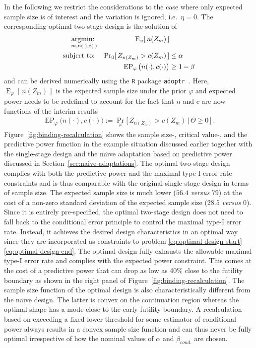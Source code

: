 \documentclass[12pt]{article}
\renewcommand{\Pr}{\operatorname{Pr}}
\newcommand{\E}{\ensuremath{\operatorname{E}}}
\newcommand{\st}{\operatorname{subject\ to:\ }}
\newcommand{\argmin}[1]{\operatornamewithlimits{argmin:\ }_{#1}}
\newcommand{\EP}{\ensuremath{\operatorname{EP}}}
\renewcommand{\Pr}{\ensuremath{\operatorname{Pr}}}
\begin{document}
In the following we restrict the considerations to the case
where only expected sample size is of interest and the variation is
ignored, i.e.~$\eta=0$.
The corresponding optimal two-stage design is the solution of
\begin{align}
    \argmin{m, n(\cdot), c(\cdot)}
        &&                                   \E_\varphi[\,n(Z_m)\,] & \label{eq:optimal-design-start}\\
    \st &&                 \Pr_{0}[\,Z_{n(Z_m)} > c(Z_m)\,] & \leq \alpha \\
        &&     \EP_\varphi\big(n(\cdot), c(\cdot)\big) & \geq 1 - \beta \label{eq:optimal-design-end}
\end{align}
and can be derived numerically using the \texttt{R} package \texttt{adoptr}~\cite{adoptrjss2020}.
Here, $\E_\varphi[\,n(Z_m)\,]$ is the expected sample size under the prior $\varphi$ and expected power needs to be redefined to account for the
fact that $n$ and $c$ are now functions of the interim results
\begin{align}
    \EP_\varphi\big(n(\cdot), c(\cdot)\big) :=
    \Pr_\varphi\big[\,Z_{n(Z_m)}>c(Z_m)\,|\,\Theta\geq0\,\big] \ .
\end{align}
Figure~\ref{fig:binding-recalculation} shows the sample size-, critical value-, and the predictive power function in the example situation discussed earlier together with the single-stage design
and the na\"{\i}ve adaptation based on predictive power discussed in
Section~\ref{sec:naive-adaptations}.
The optimal two-stage design complies with both the predictive power and the maximal type-I error rate constraints and is thus comparable with the original single-stage design in terms of sample size.
The expected sample size is much lower ($56.4$ \emph{versus} $79$) at the cost of a non-zero standard deviation of the expected sample size ($28.5$ \emph{versus} $0$).
Since it is entirely pre-specified,
the optimal two-stage design does not need to fall back to the conditional error principle to control the maximal type-I error rate.
Instead, it achieves the desired design characteristics in an optimal way since they are incorporated as constraints to problem \eqref{eq:optimal-design-start}--\eqref{eq:optimal-design-end}.
The optimal design fully exhausts the allowable maximal type-I error rate
and complies with the expected power constraint.
This comes at the cost of a predictive power that can drop as low as 40\% close to the futility boundary
as shown in the right panel of Figure~\ref{fig:binding-recalculation}.
The sample size function of the optimal design is also
characteristically different from the na\"{\i}ve design.
The latter is convex on the continuation region whereas the optimal
shape has a mode close to the early-futility boundary.
A recalculation based on exceeding a fixed lower threshold for
some estimator of conditional power always results in a convex
sample size function and can thus never be fully optimal irrespective of how the nominal values of $\alpha$ and $\beta_{cond.}$
are chosen.
\end{document}
